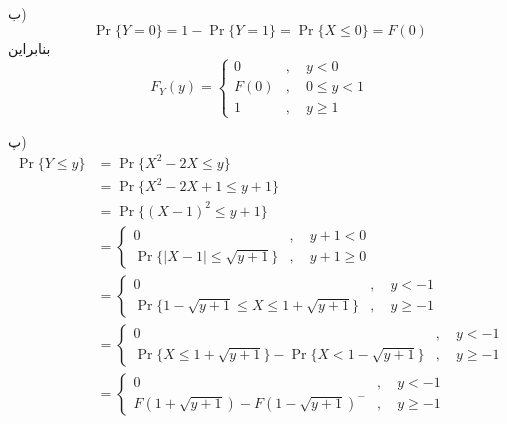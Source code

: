 \documentclass[10pt,letterpaper]{article}
\begin{document}
ب) 
$$
\Pr\{Y=0\}=1-\Pr\{Y=1\}=\Pr\{X\le0\}=F(0)
$$
بنابراین
$$
F_Y(y)=\begin{cases}
0&,\quad y<0\\
F(0)&,\quad 0\le y<1\\
1&,\quad y\ge 1
\end{cases}
$$

پ) 
\[
\begin{split}
\Pr\{Y\le y\}&=\Pr\{X^2-2X\le y\}
\\&=\Pr\{X^2-2X+1\le y+1\}
\\&=\Pr\{(X-1)^2\le y+1\}
\\&=\begin{cases}
0&,\quad y+1<0\\
\Pr\{|X-1|\le \sqrt{y+1}\}&,\quad y+1\ge 0
\end{cases}
\\&=\begin{cases}
0&,\quad y<-1\\
\Pr\{1-\sqrt{y+1}\le X\le 1+\sqrt{y+1}\}&,\quad y\ge -1
\end{cases}
\\&=\begin{cases}
0&,\quad y<-1\\
\Pr\{X\le 1+\sqrt{y+1}\}-\Pr\{X< 1-\sqrt{y+1}\}&,\quad y\ge -1
\end{cases}
\\&=\begin{cases}
0&,\quad y<-1\\
F(1+\sqrt{y+1})-F(1-\sqrt{y+1})^-&,\quad y\ge -1
\end{cases}
\end{split}
\]
\end{document}

